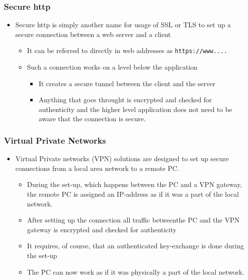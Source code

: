 \documentclass[11pt]{article}
\begin{document}
\subsubsection{Secure http}
\label{sec:org94a5669}
\begin{itemize}
\item Secure http is simply another name for usage of SSL or TLS to set up a secure connection between a web server and a client
\begin{itemize}
\item It can be referred to directly in web addresses as \texttt{https://www....}
\item Such a connection works on a level below the application
\begin{itemize}
\item It creates a secure tunnel between the client and the server
\item Anything that goes throught is encrypted and checked for authenticity and the higher level application does not need to be aware that the connection is secure.
\end{itemize}
\end{itemize}
\end{itemize}

\subsubsection{Virtual Private Networks}
\label{sec:orgd37aa89}
\begin{itemize}
\item Virtual Private networks (VPN) solutions are designed to set up secure connections from a local area network to a remote PC.
\begin{itemize}
\item During the set-up, which happens between the PC and a VPN gateway, the remote PC is assigned an IP-address as if it was a part of the local network.
\item After setting up the connection all traffic betweenthe PC and the VPN gateway is encrypted and checked for authenticity
\item It requires, of course, that an authenticated key-exchange is done during the set-up
\item The PC can now work as if it was physically a part of the local network.
\end{itemize}
\end{itemize}
\end{document}
